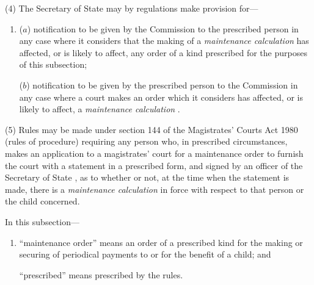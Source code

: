 \documentclass[12pt,a4paper]{article}
\begin{document}
(4) The Secretary of State may by regulations make provision for—
\begin{enumerate}\item[]
($a$) notification to be given by 
the 
Commission  %
to the prescribed person in any case where 
it  %
considers that the making of a 
\emph{maintenance calculation}  %
has affected, or is likely to affect, any order of a kind prescribed for the purposes of this subsection;

($b$) notification to be given by the prescribed person to the 
Commission  %
in any case where a court makes an order which it considers has affected, or is likely to affect, a 
\emph{maintenance calculation}%
.
\end{enumerate}

(5) Rules may be made under section 144 of the Magistrates' Courts Act 1980 (rules of procedure) requiring any person who, in prescribed circumstances, makes an application to a magistrates' court for a maintenance order to furnish the court with a statement in a prescribed form, and signed by 
an officer of the 
Secretary of State%
, as to whether or not, at the time when the statement is made, there is a 
\emph{maintenance calculation}  %
in force with respect to that person or the child concerned.

In this subsection—
\begin{enumerate}\item[]
    “maintenance order” means an order of a prescribed kind for the making or securing of periodical payments to or for the benefit of a child; and

    “prescribed” means prescribed by the rules. 
\end{enumerate}

\end{document}
